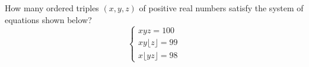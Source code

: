 How many ordered triples $(x, y, z)$ of positive real numbers satisfy the system of equations shown below? \[\begin{cases} xyz = 100 \\ 
xy\lfloor z \rfloor = 99 \\
x\lfloor yz \rfloor  = 98 \end{cases}\]
